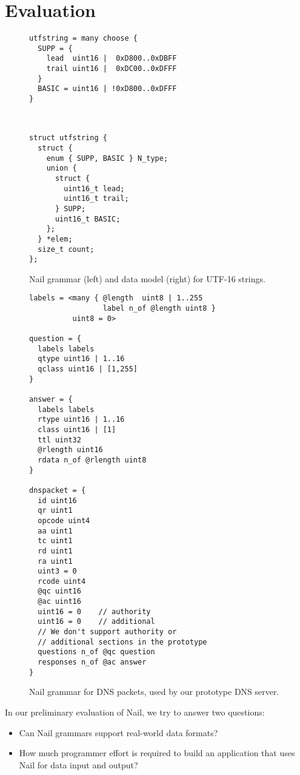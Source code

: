 \section{Evaluation}
\label{s:eval}

\begin{figure*}
\begin{minipage}{0.45\paperwidth}
\begin{verbatim}
utfstring = many choose {
  SUPP = {
    lead  uint16 |  0xD800..0xDBFF
    trail uint16 |  0xDC00..0xDFFF
  }
  BASIC = uint16 | !0xD800..0xDFFF
}
\end{verbatim}
\end{minipage}
~
\begin{minipage}{0.45\paperwidth}
\begin{verbatim}
struct utfstring {
  struct {
    enum { SUPP, BASIC } N_type;
    union {
      struct {
        uint16_t lead;
        uint16_t trail;
      } SUPP;
      uint16_t BASIC;
    };
  } *elem;
  size_t count;
};
\end{verbatim} 
\end{minipage}
\caption{Nail grammar (left) and data model (right) for UTF-16 strings.}
\label{fig:utf16}
\end{figure*}


\begin{figure}
\begin{verbatim}
labels = <many { @length  uint8 | 1..255 
                 label n_of @length uint8 }
          uint8 = 0>

question = {
  labels labels
  qtype uint16 | 1..16 
  qclass uint16 | [1,255]
}

answer = {
  labels labels
  rtype uint16 | 1..16
  class uint16 | [1]
  ttl uint32
  @rlength uint16 
  rdata n_of @rlength uint8 
}

dnspacket = {
  id uint16
  qr uint1
  opcode uint4
  aa uint1 
  tc uint1
  rd uint1
  ra uint1
  uint3 = 0
  rcode uint4
  @qc uint16
  @ac uint16
  uint16 = 0    // authority 
  uint16 = 0    // additional
  // We don't support authority or 
  // additional sections in the prototype
  questions n_of @qc question
  responses n_of @ac answer
}
\end{verbatim}
\caption{Nail grammar for DNS packets, used by our prototype DNS server.}
\label{fig:dns-full}
\end{figure}


In our preliminary evaluation of Nail, we try to answer two questions:

\begin{itemize}
\item Can Nail grammars support real-world data formats?
\item How much programmer effort is required to build an
      application that uses Nail for data input and output?
\end{itemize}

